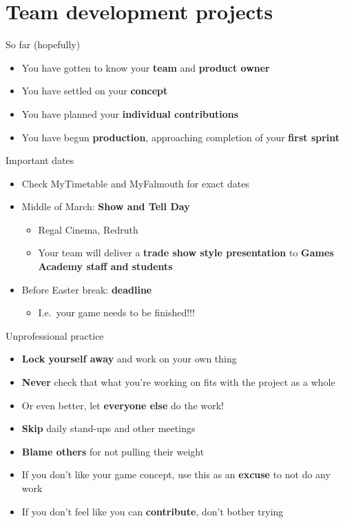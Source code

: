 \part{Team development projects}
\frame{\partpage}

\begin{frame}{So far (hopefully)}
	\begin{itemize}
		\pause\item You have gotten to know your \textbf{team} and \textbf{product owner}
		\pause\item You have settled on your \textbf{concept}
		\pause\item You have planned your \textbf{individual contributions}
		\pause\item You have begun \textbf{production}, approaching completion of your \textbf{first sprint}
	\end{itemize}
\end{frame}

\begin{frame}{Important dates}
	\begin{itemize}
		\pause\item Check MyTimetable and MyFalmouth for exact dates
		\pause\item Middle of March: \textbf{Show and Tell Day}
			\begin{itemize}
				\pause\item Regal Cinema, Redruth
				\pause\item Your team will deliver a \textbf{trade show style presentation} to \textbf{Games Academy staff and students}
			\end{itemize}
		\pause\item Before Easter break: \textbf{deadline}
			\begin{itemize}
				\pause\item I.e.\ your game needs to be finished!!!
			\end{itemize}
	\end{itemize}
\end{frame}

\begin{frame}{Unprofessional practice}
	\begin{itemize}
		\pause\item \textbf{Lock yourself away} and work on your own thing
		\pause\item \textbf{Never} check that what you're working on fits with the project as a whole
		\pause\item Or even better, let \textbf{everyone else} do the work!
		\pause\item \textbf{Skip} daily stand-ups and other meetings
		\pause\item \textbf{Blame others} for not pulling their weight
		\pause\item If you don't like your game concept, use this as an \textbf{excuse} to not do any work
		\pause\item If you don't feel like you can \textbf{contribute}, don't bother trying
	\end{itemize}
\end{frame}

